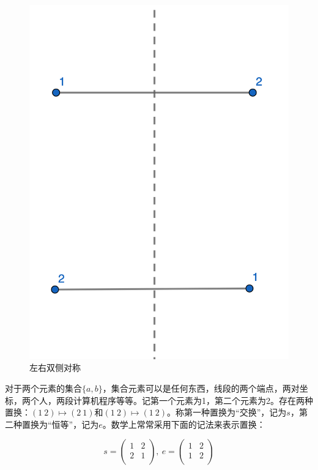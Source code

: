 \documentclass[b5paper]{ctexart}
\begin{document}
\begin{figure}[htbp]
  \centering
  \includegraphics[scale=0.8]{img/reflection.png}
  \caption{左右双侧对称}
  \label{fig:reflection}
\end{figure}

对于两个元素的集合$\{a, b\}$，集合元素可以是任何东西，线段的两个端点，两对坐标，两个人，两段计算机程序等等。记第一个元素为1，第二个元素为2。存在两种置换：$(1\ 2) \mapsto (2\ 1)$和$(1\ 2) \mapsto (1\ 2)$。称第一种置换为“交换”，记为$s$，第二种置换为“恒等”，记为$e$。数学上常常采用下面的记法来表示置换：

\[ s = \begin{pmatrix}
1 & 2 \\
2 & 1 \\
\end{pmatrix}
,\
e = \begin{pmatrix}
1 & 2 \\
1 & 2 \\
\end{pmatrix}
\]
\end{document}
